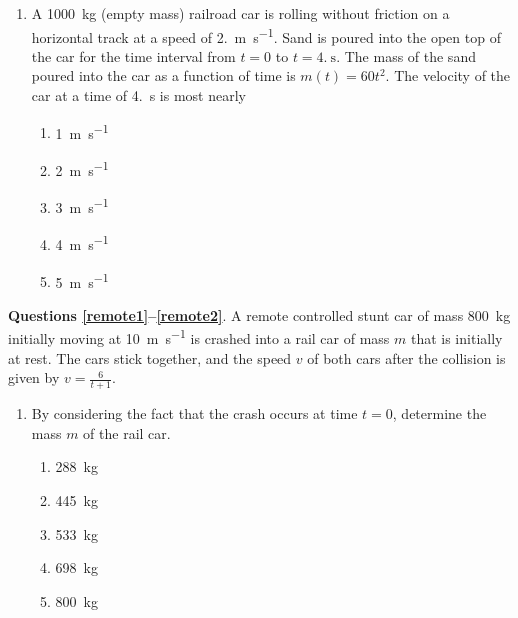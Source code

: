 \documentclass{../../oss-apphys}
\begin{document}
\begin{multicols}{2}
\begin{enumerate}[resume,leftmargin=18pt]

  \item A \SI{1000}{\kilo\gram} (empty mass) railroad car is rolling without
    friction on a horizontal track at a speed of \SI{2.}{\metre\per\second}.
    Sand is poured into the open top of the car for the time interval from
    $t=0$ to $t=\SI{4.}{\second}$. The mass of the sand poured into the car as
    a function of time is $m(t)=60t^2$. The velocity of the car at a time of
    \SI{4.}{\second} is most nearly
    \begin{center}
    \end{center}
    \begin{enumerate}[noitemsep,topsep=0pt,leftmargin=18pt,label=(\Alph*)]
    \item\SI{1}{\metre\per\second}
    \item\SI{2}{\metre\per\second}
    \item\SI{3}{\metre\per\second}
    \item\SI{4}{\metre\per\second}
    \item\SI{5}{\metre\per\second}
    \end{enumerate}
  \end{enumerate}
  
  \textbf{Questions \ref{remote1}--\ref{remote2}}. A remote controlled stunt
  car of mass \SI{800}{\kilo\gram} initially moving at
  \SI{10}{\metre\per\second} is crashed into a rail car of mass $m$ that is
  initially at rest. The cars stick together, and the speed $v$ of both cars
  after the collision is given by $\displaystyle v=\frac{6}{t+1}$.

  \begin{enumerate}[resume,leftmargin=18pt]
  \item By considering the fact that the crash occurs at time $t=0$, determine
    the mass $m$ of the rail car.
    \label{remote1}
    \begin{enumerate}[noitemsep,topsep=0pt,leftmargin=18pt,label=(\Alph*)]
    \item\SI{288}{\kilo\gram}
    \item\SI{445}{\kilo\gram}
    \item\SI{533}{\kilo\gram}
    \item\SI{698}{\kilo\gram}
    \item\SI{800}{\kilo\gram}
    \end{enumerate}
    

\end{enumerate}
\end{multicols}
\end{document}
